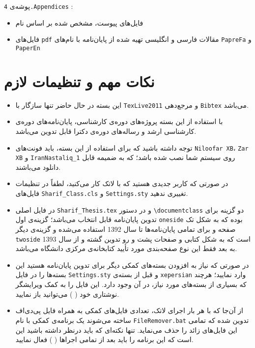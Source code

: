 پوشه‌ی
\verb!4.Appendices! :
\begin{itemize}
\item
فایل‌‌های پیوست، مشخص شده بر اساس نام 
\item
فایل‌‌های \verb!pdf! مقالات فارسی و انگلیسی تهیه شده از پایان‌نامه با نام‌های \verb!PapreFa! و \verb!PaperEn!
\end{itemize}
\newpage
\section{نکات مهم و تنظیمات لازم}
\begin{itemize}
\item
این بسته در حال حاضر تنها سازگار با 
\verb!TexLive2011!
و مرجع‌دهی
\verb!Bibtex!
می‌باشد.
\item
با استفاده از این بسته پروژه‌های دوره‌ی کارشناسی، پایان‌نامه‌های دوره‌ی کارشناسی ارشد و رساله‌های دوره‌ی دکترا قابل تدوین می‌باشد.
\item
توجه داشته باشید که برای استفاده از این بسته، باید فونت‌های
\verb!Niloofar XB!،
\verb!Zar XB!
 و
\verb!IranNastaliq_1!
روی سیستم شما نصب شده باشد؛ که به ضمیمه قابل دانلود ‌می‌باشند.
\item
در صورتی که کاربر جدیدی هستید که با لاتک کار می‌کنید، لطفاً در تنظیمات فایل‌های 
\verb!Sharif_Class.cls!
و
\verb!Settings.sty!
تغییری ندهید.
\item
در فایل اصلی 
\verb!Sharif_Thesis.tex!
و در دستور  
\verb!\documentclass!
دو گزینه برای تدوین پایان‌نامه قابل انتخاب می‌باشد؛ گزینه‌ی اول
\verb!oneside!
بوده که به شکل تک صفحه و برای تمامی پایان‌نامه‌ها تا سال 1392 استفاده می‌شده و گزینه‌ی دیگر 
\verb!twoside!
است که به شکل کتابی و صفحات پشت و رو تدوین گشته و از سال 1393 به بعد فقط این نوع صفحه‌بندی مورد تأیید کتابخانه‌ی مرکزی دانشگاه می‌باشد.
\item
در صورتی که نیاز به افزودن بسته‌های کمکی دیگر برای تدوین پایان‌نامه هستید این بسته‌ها را در فایل 
\verb!Settings.sty!
و قبل از بسته‌ی 
\verb!xepersian!
وارد نمایید؛ هرچند که بسیاری از بسته‌های مورد نیاز، در آن وجود دارد. این فایل را به کمک ویرایشگر نوشتاری خود \linebreak(
) می‌توانید باز نمایید.
\item
از آن‌جا که با هر بار اجرای لاتک، تعدادی فایل‌های کمکی به همراه فایل پی‌دی‌اف ساخته می‌شوند یک برنامه‌ی کمکی با نام
\verb!FileRemover.bat!
تدوین شده که تمامی این فایل‌های زائد را حذف می‌نماید. تنها نکته‌ای که باید درنظر داشته باشید این است که این برنامه را باید بعد از تمامی اجراها (
) فعال نمایید.

\end{itemize}
